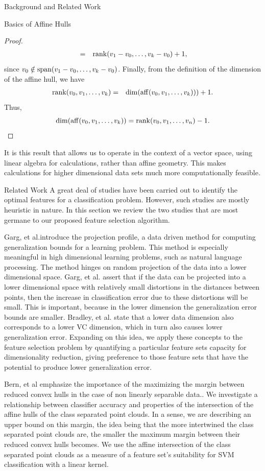 \documentclass{llncs}
\begin{document}
\begin{section}{Background and Related Work}
\begin{subsection}{Basics of Affine Hulls}
\begin{proof}
\begin{eqnarray*}
&=&\operatorname{rank}(v_1-v_0,\dots,v_k-v_0)+1,\end{eqnarray*}
since $v_0\notin \operatorname{span}(v_1-v_0,\dots,v_k-v_0)$. Finally, from the definition of the dimension of the affine hull, we have
\begin{eqnarray*}
\operatorname{rank}(v_0,v_1,\dots,v_k)&=&\dim(\operatorname{aff}(v_0,v_1,\dots,v_k))) +1.\end{eqnarray*}
Thus,
$$\dim(\operatorname{aff}(v_0,v_1,\dots,v_k)) =\operatorname{rank}(v_0,v_1,\dots,v_n)-1.$$
\end{proof}
It is this result that allows us to operate in the context of a vector space, using linear algebra for calculations, rather than affine geometry. This makes calculations for higher dimensional data sets much more computationally feasible.
\end{subsection}
\begin{subsection}{Related Work}
A great deal of studies have been carried out to identify the optimal features for a classification problem\cite{Molina}\cite{Joachims}. However, such studies are mostly heuristic in nature. In this section we review the two studies that are most germane to our proposed feature selection algorithm.


Garg, et al.introduce the projection profile, a data driven method for computing generalization bounds for a learning problem\cite{Garg}. This method is especially meaningful in high dimensional learning problems, such as natural language processing\cite{Garg}. The method hinges on random projection of the data into a lower dimensional space. Garg, et al. assert that if the data can be projected into a lower dimensional space with relatively small distortions in the distances between points, then the increase in classification error due to these distortions will be small\cite{Garg}. This is important, because in the lower dimension the generalization error bounds are smaller. Bradley, et al.\cite{Bradley} state that a lower data dimension also corresponds to a lower VC dimension, which in turn also causes lower generalization error\cite{Vapnik}. Expanding on this idea, we apply these concepts to the feature selection problem by quantifying a particular feature sets capacity for dimensionality reduction, giving preference to those feature sets that have the potential to produce lower generalization error.

Bern, et al emphasize the importance of the maximizing the margin between reduced convex hulls in the case of non linearly separable data.\cite{Bern}. We investigate a relationship between classifier accuracy and properties of the intersection of the affine hulls of the class separated point clouds. In a sense, we are describing an upper bound on this margin, the idea being that the more intertwined the class separated point clouds are, the smaller the maximum margin between their reduced convex hulls becomes. We use the affine intersection of the class separated point clouds as a measure of a feature set's suitability for SVM classification with a linear kernel.
\end{subsection}
\end{section}
\end{document}
